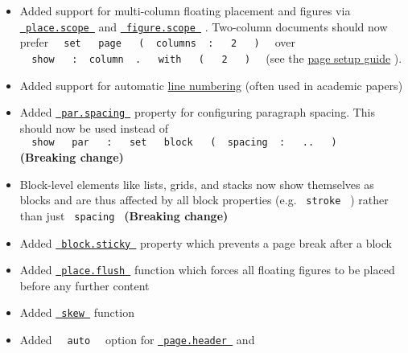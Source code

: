 \begin{itemize}
\tightlist
\item
  Added support for multi-column floating placement and figures via
  \href{/docs/reference/layout/place/\#parameters-scope}{\texttt{\ place.scope\ }}
  and
  \href{/docs/reference/model/figure/\#parameters-scope}{\texttt{\ figure.scope\ }}
  . Two-column documents should now prefer
  \texttt{\ }{\texttt{\ set\ }}\texttt{\ }{\texttt{\ page\ }}\texttt{\ }{\texttt{\ (\ }}\texttt{\ columns\ }{\texttt{\ :\ }}\texttt{\ }{\texttt{\ 2\ }}\texttt{\ }{\texttt{\ )\ }}\texttt{\ }
  over
  \texttt{\ }{\texttt{\ show\ }}\texttt{\ }{\texttt{\ :\ }}\texttt{\ column\ }{\texttt{\ .\ }}\texttt{\ }{\texttt{\ with\ }}\texttt{\ }{\texttt{\ (\ }}\texttt{\ }{\texttt{\ 2\ }}\texttt{\ }{\texttt{\ )\ }}\texttt{\ }
  (see the \href{/docs/guides/page-setup-guide/\#columns}{page setup
  guide} ).
\item
  Added support for automatic
  \href{/docs/reference/model/par/\#definitions-line}{line numbering}
  (often used in academic papers)
\item
  Added
  \href{/docs/reference/model/par/\#parameters-spacing}{\texttt{\ par.spacing\ }}
  property for configuring paragraph spacing. This should now be used
  instead of
  \texttt{\ }{\texttt{\ show\ }}\texttt{\ }{\texttt{\ par\ }}\texttt{\ }{\texttt{\ :\ }}\texttt{\ }{\texttt{\ set\ }}\texttt{\ }{\texttt{\ block\ }}\texttt{\ }{\texttt{\ (\ }}\texttt{\ spacing\ }{\texttt{\ :\ }}\texttt{\ }{\texttt{\ ..\ }}\texttt{\ }{\texttt{\ )\ }}\texttt{\ }
  \textbf{(Breaking change)}
\item
  Block-level elements like lists, grids, and stacks now show themselves
  as blocks and are thus affected by all block properties (e.g.
  \texttt{\ stroke\ } ) rather than just \texttt{\ spacing\ }
  \textbf{(Breaking change)}
\item
  Added
  \href{/docs/reference/layout/block/\#parameters-sticky}{\texttt{\ block.sticky\ }}
  property which prevents a page break after a block
\item
  Added
  \href{/docs/reference/layout/place/\#definitions-flush}{\texttt{\ place.flush\ }}
  function which forces all floating figures to be placed before any
  further content
\item
  Added \href{/docs/reference/layout/skew/}{\texttt{\ skew\ }} function
\item
  Added \texttt{\ }{\texttt{\ auto\ }}\texttt{\ } option for
  \href{/docs/reference/layout/page/\#parameters-header}{\texttt{\ page.header\ }}
  and

\end{itemize}
